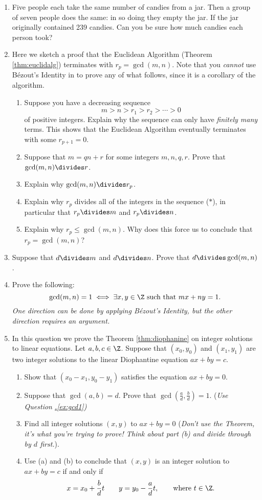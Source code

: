 \begin{enumerate}
  \item Five people each take the same number of candies from a jar. Then a group of seven people does the same: in so doing they empty the jar. If the jar originally contained 239 candies. Can you be sure how much candies each person took?

  \item Here we sketch a proof that the Euclidean Algorithm (Theorem \ref{thm:euclidalg}) terminates with $r_p=\gcd(m,n)$. Note that you \emph{cannot} use Bézout's Identity in to prove any of what follows, since it is a corollary of the algorithm.
  \begin{enumerate}
    \item Suppose you have a decreasing sequence
    \[m>n>r_1>r_2>\cdots>0\tag*{($\ast$)}\]
    of positive integers. Explain why the sequence can only have \emph{finitely many} terms. This shows that the Euclidean Algorithm eventually terminates with some $r_{p+1}=0$.
  	\item Suppose that $m=qn+r$ for some integers $m,n,q,r$. Prove that $\gcd(m,n)\divides r$.
  	\item Explain why $\gcd(m,n)\divides r_p$.
  	\item Explain why $r_p$ divides all of the integers in the sequence ($\ast$), in particular that $r_p\divides m$ and $r_p\divides n$.
  	\item Explain why $r_p\le\gcd(m,n)$. Why does this force us to conclude that $r_p=\gcd(m,n)$?
  \end{enumerate}
  
  \item Suppose that $d\divides m$ and $d\divides n$. Prove that $d\divides\gcd(m,n)$.

  \item\label{ex:gcd1} Prove the following:
  \[\gcd(m,n)=1\iff\exists x,y\in\Z\text{ such that }mx+ny=1.\]
  \emph{One direction can be done by applying Bézout's Identity, but the other direction requires an argument.}
  
  
  \item In this question we prove the Theorem \ref{thm:diophanine} on integer solutions to linear equations. Let $a,b,c\in\Z$. Suppose that $(x_0,y_0)$ and $(x_1,y_1)$ are two integer solutions to the linear Diophantine equation $ax+by=c$.
  \begin{enumerate}
    \item Show that $(x_0-x_1,y_0-y_1)$ satisfies the equation $ax+by=0$.
    \item Suppose that $\gcd(a,b)=d$. Prove that $\gcd(\frac ad,\frac bd)=1$. (\emph{Use Question \hyperref[ex:gcd1]{\thesubsection.\ref*{ex:gcd1}})}
    \item Find all integer solutions $(x,y)$ to $ax+by=0$ (\emph{Don't use the Theorem, it's what you're trying to prove! Think about part (b) and divide through by $d$ first.}).
    \item Use (a) and (b) to conclude that $(x,y)$ is an integer solution to $ax+by=c$ if and only if
    \[x=x_0+\frac bdt\qquad y=y_0-\frac adt,\qquad \text{where }t\in\Z.\]
  \end{enumerate}
  

\end{enumerate}
